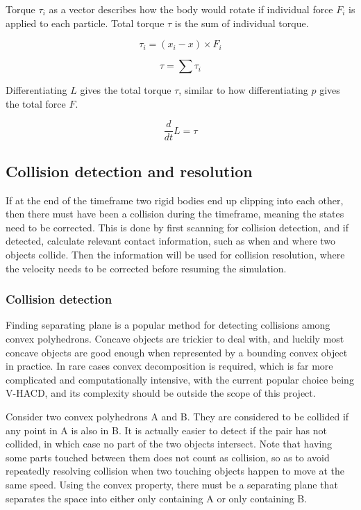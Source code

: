 \documentclass[12pt,a4paper,twoside,openright]{report}
\begin{document}
Torque $\tau_i$ as a vector describes how the body would rotate if individual force $F_i$ is applied to each particle. Total torque $\tau$ is the sum of individual torque.

\begin{equation}
\tau_i = (x_i - x) \times F_i
\end{equation}

\begin{equation}
\tau = \sum \tau_i
\end{equation}

Differentiating $L$ gives the total torque $\tau$, similar to how differentiating $p$ gives the total force $F$.

\begin{equation}
\frac{d}{dt} L = \tau
\end{equation}

\subsection{Collision detection and resolution}

If at the end of the timeframe two rigid bodies end up clipping into each other, then there must have been a collision during the timeframe, meaning the states need to be corrected. This is done by first scanning for collision detection, and if detected, calculate relevant contact information, such as when and where two objects collide. Then the information will be used for collision resolution, where the velocity needs to be corrected before resuming the simulation.

\subsubsection{Collision detection}

Finding separating plane is a popular method for detecting collisions among convex polyhedrons. Concave objects are trickier to deal with, and luckily most concave objects are good enough when represented by a bounding convex object in practice. In rare cases convex decomposition is required, which is far more complicated and computationally intensive, with the current popular choice being V-HACD\cite{mamou2016volumetric}, and its complexity should be outside the scope of this project.

Consider two convex polyhedrons A and B. They are considered to be collided if any point in A is also in B. It is actually easier to detect if the pair has not collided, in which case no part of the two objects intersect. Note that having some parts touched between them does not count as collision, so as to avoid repeatedly resolving collision when two touching objects happen to move at the same speed. Using the convex property, there must be a separating plane that separates the space into either only containing A or only containing B.
\end{document}
